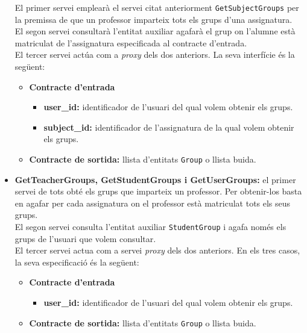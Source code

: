 \begin{itemize}
			El primer servei emplearà el servei citat anteriorment \texttt{GetSubjectGroups} per la premissa de que un professor imparteix tots els grups d'una assignatura.\\
			
			El segon servei consultarà l'entitat auxiliar agafarà el grup on l'alumne està matriculat de l'assignatura especificada al contracte d'entrada.\\
			
			El tercer servei actúa com a \emph{proxy} dels dos anteriors. La seva interfície és la següent:
				\begin{itemize}
					\item \textbf{Contracte d'entrada}
						\begin{itemize}
							\item \textbf{user\_id:} identificador de l'usuari del qual volem obtenir els grups.
							\item \textbf{subject\_id:} identificador de l'assignatura de la qual volem obtenir els grups.
						\end{itemize}
					\item \textbf{Contracte de sortida:} llista d'entitats \texttt{Group} o llista buida.
				\end{itemize}
			
			\item \textbf{GetTeacherGroups, GetStudentGroups i GetUserGroups:} el primer servei de tots obté els grups que imparteix un professor. Per obtenir-los basta en agafar per cada assignatura on el professor està matriculat tots els seus grups.\\
			
			El segon servei consulta l'entitat auxiliar \texttt{StudentGroup} i agafa només els grups de l'usuari que volem consultar.\\
			
			El tercer servei actua com a servei \emph{proxy} dels dos anteriors. En els tres casos, la seva especificació és la següent:
		
			\begin{itemize}
					\item \textbf{Contracte d'entrada}
						\begin{itemize}
							\item \textbf{user\_id:} identificador de l'usuari del qual volem obtenir els grups.
						\end{itemize}
					\item \textbf{Contracte de sortida:} llista d'entitats \texttt{Group} o llista buida.
				\end{itemize}
				
		\end{itemize}

